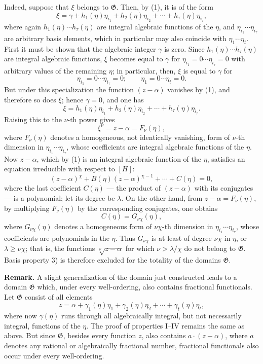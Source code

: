 \documentclass[11pt]{article}
\begin{document}
Indeed, suppose that $\xi$ belongs to $\mathfrak G$. Then, by (1), it is of the
form
\[
 \xi=\gamma+h_1(\eta)\eta_{i_1}+h_2(\eta)\eta_{i_2}
      +\cdots+h_\tau(\eta)\eta_{i_\tau},
\]
where again $h_1(\eta)\cdots h_\tau(\eta)$ are integral algebraic functions of
the $\eta$, and $\eta_{i_1}\cdots\eta_{i_\tau}$ are arbitrary basis elements,
which in particular may also coincide with $\eta_1\cdots\eta_t$. First it must be
shown that the algebraic integer $\gamma$ is zero. Since
$h_1(\eta)\cdots h_\tau(\eta)$ are integral algebraic functions, $\xi$ becomes
equal to $\gamma$ for
$\eta_{i_1}=0\cdots\eta_{i_\tau}=0$ with arbitrary values of the remaining
$\eta$; in particular, then, $\xi$ is equal to $\gamma$ for
\[
 \eta_{i_1}=0\cdots \eta_{i_\tau}=0; \qquad
 \eta_1=0\cdots \eta_t=0.
\]
But under this specialization the function $(z-\alpha)$ vanishes by (1), and
therefore so does $\xi$; hence $\gamma=0$, and one has
\[
 \xi=h_1(\eta)\eta_{i_1}+h_2(\eta)\eta_{i_2}
      +\cdots+h_\tau(\eta)\eta_{i_\tau}.
\]
Raising this to the $\nu$-th power gives
\[
 \xi^\nu=z-\alpha=F_\nu(\eta),
\]
where $F_\nu(\eta)$ denotes a homogeneous, not identically vanishing, form of
$\nu$-th dimension in $\eta_{i_1}\cdots\eta_{i_\tau}$, whose coefficients are
integral algebraic functions of the $\eta$. Now $z-\alpha$, which by (1) is an
integral algebraic function of the $\eta$, satisfies an equation irreducible with
respect to $[H]$:
\[
 (z-\alpha)^\chi+B(\eta)(z-\alpha)^{\chi-1}+\cdots+C(\eta)=0,
\]
where the last coefficient $C(\eta)$ --- the product of $(z-\alpha)$ with its
conjugates --- is a polynomial; let its degree be $\lambda$. On the other hand,
from $z-\alpha=F_\nu(\eta)$, by multiplying $F_\nu(\eta)$ by the corresponding
conjugates, one obtains
\[
 C(\eta)=G_{\nu\chi}(\eta),
\]
where $G_{\nu\chi}(\eta)$ denotes a homogeneous form of $\nu\chi$-th dimension
in $\eta_{i_1}\cdots\eta_{i_\tau}$, whose coefficients are polynomials in the
$\eta$. Thus $G_{\nu\chi}$ is at least of degree $\nu\chi$ in $\eta$, or
$\lambda\geq\nu\chi$; that is, the functions $\sqrt[\nu]{z-\alpha}$ for which
$\nu>\lambda/\chi$ do not belong to $\mathfrak G$. Basis property 3) is therefore
excluded for the totality of the domains $\mathfrak G$.

\textbf{Remark.} A slight generalization of the domain just constructed leads to
a domain $\mathfrak G$ which, under every well-ordering, also contains fractional
functionals. Let $\mathfrak G$ consist of all elements
\[
 z=\alpha+\gamma_1(\eta)\eta_1+\gamma_2(\eta)\eta_2
      +\cdots+\gamma_t(\eta)\eta_t,
\]
where now $\gamma(\eta)$ runs through all algebraically integral, but not
necessarily integral, functions of the $\eta$. The proof of properties I--IV
remains the same as above. But since $\mathfrak G$, besides every function $z$,
also contains $a\cdot(z-\alpha)$, where $a$ denotes any rational or
algebraically fractional number, fractional functionals also occur under every
well-ordering.
\end{document}
